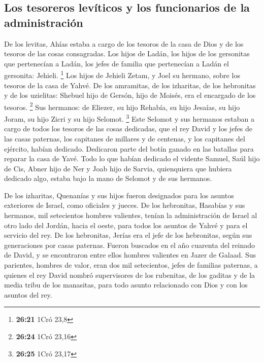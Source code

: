 \hypertarget{los-tesoreros-levuxedticos-y-los-funcionarios-de-la-administraciuxf3n}{%
\subsection{Los tesoreros levíticos y los funcionarios de la
administración}\label{los-tesoreros-levuxedticos-y-los-funcionarios-de-la-administraciuxf3n}}

 De los levitas, Ahías estaba a cargo de los tesoros de
la casa de Dios y de los tesoros de las cosas consagradas.
 Los hijos de Ladán, los hijos de los gersonitas que
pertenecían a Ladán, los jefes de familia que pertenecían a Ladán el
gersonita: Jehieli. \footnote{\textbf{26:21} 1Cró 23,8} 
Los hijos de Jehieli Zetam, y Joel su hermano, sobre los tesoros de la
casa de Yahvé.  De los amramitas, de los izharitas, de
los hebronitas y de los uzielitas:  Shebuel hijo de
Gersón, hijo de Moisés, era el encargado de los tesoros. \footnote{\textbf{26:24}
  1Cró 23,16}  Sus hermanos: de Eliezer, su hijo Rehabía,
su hijo Jesaías, su hijo Joram, su hijo Zicri y su hijo Selomot.
\footnote{\textbf{26:25} 1Cró 23,17}  Este Selomot y sus
hermanos estaban a cargo de todos los tesoros de las cosas dedicadas,
que el rey David y los jefes de las casas paternas, los capitanes de
millares y de centenas, y los capitanes del ejército, habían dedicado.
 Dedicaron parte del botín ganado en las batallas para
reparar la casa de Yavé.  Todo lo que habían dedicado el
vidente Samuel, Saúl hijo de Cis, Abner hijo de Ner y Joab hijo de
Sarvia, quienquiera que hubiera dedicado algo, estaba bajo la mano de
Selomot y de sus hermanos.

 De los izharitas, Quenanías y sus hijos fueron
designados para los asuntos exteriores de Israel, como oficiales y
jueces.  De los hebronitas, Hasabías y sus hermanos, mil
setecientos hombres valientes, tenían la administración de Israel al
otro lado del Jordán, hacia el oeste, para todos los asuntos de Yahvé y
para el servicio del rey.  De los hebronitas, Jerías era
el jefe de los hebronitas, según sus generaciones por casas paternas.
Fueron buscados en el año cuarenta del reinado de David, y se
encontraron entre ellos hombres valientes en Jazer de Galaad.
 Sus parientes, hombres de valor, eran dos mil
setecientos, jefes de familias paternas, a quienes el rey David nombró
supervisores de los rubenitas, de los gaditas y de la media tribu de los
manasitas, para todo asunto relacionado con Dios y con los asuntos del
rey.

